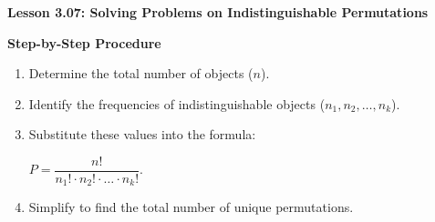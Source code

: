 \begin{center}
\textbf{Lesson 3.07: Solving Problems on Indistinguishable Permutations}
\end{center}

\vspace*{-1.5ex}

\noindent\textbf{Step-by-Step Procedure}

\begin{enumerate}
    \item Determine the total number of objects (\(n\)).
    \item Identify the frequencies of indistinguishable objects (\(n_1, n_2, \ldots, n_k\)).
    \item Substitute these values into the formula:

      {\centering $ 
    P = \dfrac{n!}{n_1! \cdot n_2! \cdot \ldots \cdot n_k!}.
 $\par}
    \item Simplify to find the total number of unique permutations.
\end{enumerate}
